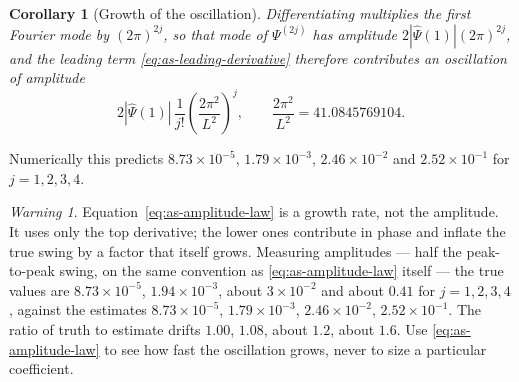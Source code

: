 \documentclass[11pt,oneside]{article}
\newtheorem{corollary}[theorem]{Corollary}
\theoremstyle{definition}
\theoremstyle{remark}
\newtheorem{warning}[theorem]{Warning}
\begin{document}
\begin{corollary}[Growth of the oscillation]
\label{cor:as-amplitude-growth}
Differentiating multiplies the first Fourier mode by $(2\pi)^{2j}$, so that mode of
$\Psi^{(2j)}$ has amplitude $2|\widehat\Psi(1)|(2\pi)^{2j}$, and the leading term
\eqref{eq:as-leading-derivative} therefore contributes an oscillation of amplitude
\begin{equation}
 2|\widehat\Psi(1)|\,\frac1{j!}\left(\frac{2\pi^{2}}{L^{2}}\right)^{\!j},
 \qquad \frac{2\pi^{2}}{L^{2}}=41.0845769104.              \label{eq:as-amplitude-law}
\end{equation}
\end{corollary}

Numerically this predicts $8.73\times10^{-5}$, $1.79\times10^{-3}$, $2.46\times10^{-2}$ and
$2.52\times10^{-1}$ for $j=1,2,3,4$.

\begin{warning}
Equation~\eqref{eq:as-amplitude-law} is a growth rate, not the amplitude.  It uses only the
top derivative; the lower ones contribute in phase and inflate the true swing by a factor
that itself grows.  Measuring amplitudes --- half the peak-to-peak swing, on the same
convention as \eqref{eq:as-amplitude-law} itself --- the true values are
$8.73\times10^{-5}$, $1.94\times10^{-3}$, about $3\times10^{-2}$ and about $0.41$ for
$j=1,2,3,4$, against the estimates $8.73\times10^{-5}$, $1.79\times10^{-3}$,
$2.46\times10^{-2}$, $2.52\times10^{-1}$.  The ratio of truth to estimate drifts $1.00$,
$1.08$, about $1.2$, about $1.6$.  Use \eqref{eq:as-amplitude-law} to see how fast the
oscillation grows, never to size a particular coefficient.
\end{warning}
\end{document}
